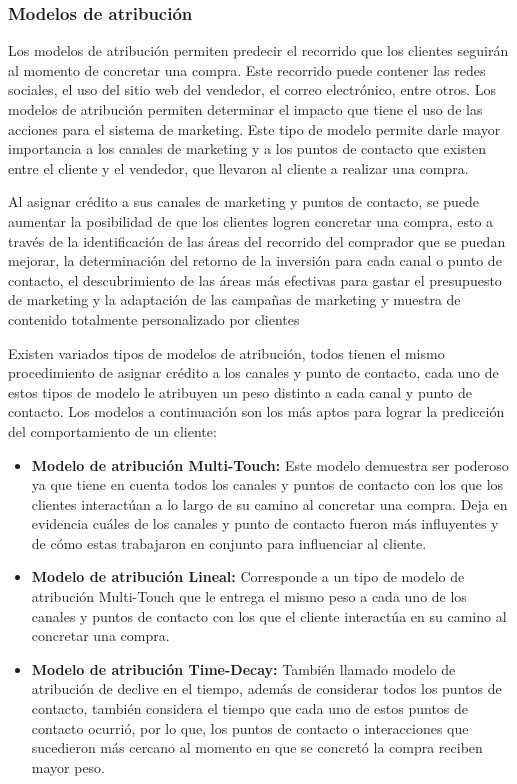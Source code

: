 \subsubsection{Modelos de atribución}

Los modelos de atribución permiten predecir el recorrido que los clientes seguirán al momento de concretar una compra. Este recorrido puede contener las redes sociales, el uso del sitio web del vendedor, el correo electrónico, entre otros. Los modelos de atribución permiten determinar el impacto que tiene el uso de las acciones para el sistema de marketing. Este tipo de modelo permite darle mayor importancia a los canales de marketing y a los puntos de contacto que existen entre el cliente y el vendedor, que llevaron al cliente a realizar una compra.

Al asignar crédito a sus canales de marketing y puntos de contacto, se puede aumentar la posibilidad de que los clientes logren concretar una compra, esto a través de la identificación de las áreas del recorrido del comprador que se puedan mejorar, la determinación del retorno de la inversión para cada canal o punto de contacto, el descubrimiento de las áreas más efectivas para gastar el presupuesto de marketing y la adaptación de las campañas de marketing y muestra de contenido totalmente personalizado por clientes \cite{modelo-atribucion}

Existen variados tipos de modelos de atribución, todos tienen el mismo procedimiento de asignar crédito a los canales y punto de contacto, cada uno de estos tipos de modelo le atribuyen un peso distinto a cada canal y punto de contacto. Los modelos a continuación son los más aptos para lograr la predicción del comportamiento de un cliente:

\begin{itemize}
\item \textbf{Modelo de atribución Multi-Touch:} Este modelo demuestra ser poderoso ya que tiene en cuenta todos los canales y puntos de contacto con los que los clientes interactúan a lo largo de su camino al concretar una compra. Deja en evidencia cuáles de los canales y punto de contacto fueron más influyentes y de cómo estas trabajaron en conjunto para influenciar al cliente.
\item \textbf{Modelo de atribución Lineal:} Corresponde a un tipo de modelo de atribución Multi-Touch que le entrega el mismo peso a cada uno de los canales y puntos de contacto con los que el cliente interactúa en su camino al concretar una compra.
\item \textbf{Modelo de atribución Time-Decay:} También llamado modelo de atribución de declive en el tiempo, además de considerar todos los puntos de contacto, también considera el tiempo que cada uno de estos puntos de contacto ocurrió, por lo que, los puntos de contacto o interacciones que sucedieron más cercano al momento en que se concretó la compra reciben mayor peso.
\end{itemize}

